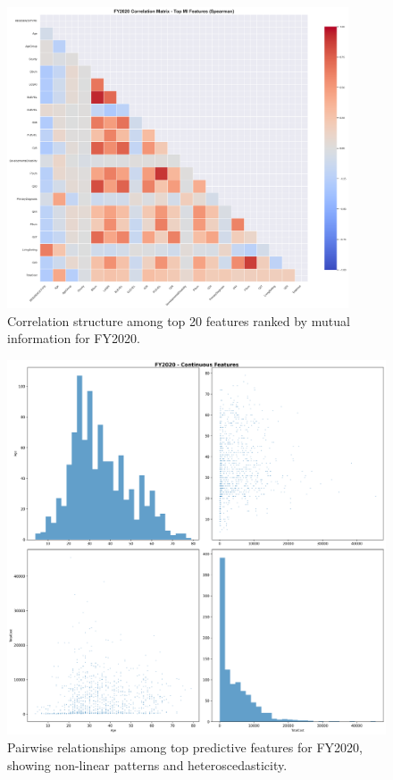 \begin{figure}[htbp]
    \centering
    \includegraphics[width=0.9\textwidth]{figures/fy2020_correlation_matrix_-_top_mi_features_(spearman).png}
    \caption{Correlation structure among top 20 features ranked by mutual information for FY2020.}
    \label{fig:fy2020-corr-top}
\end{figure}

\newpage

\begin{figure}[htbp]
    \centering
    \includegraphics[width=\textwidth]{figures/fy2020_pairplot_top_features.png}
    \caption{Pairwise relationships among top predictive features for FY2020, showing non-linear patterns and heteroscedasticity.}
    \label{fig:fy2020-pairplot}
\end{figure}


